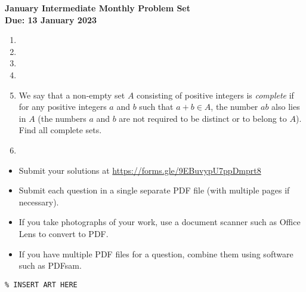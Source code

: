 \documentclass{article}
\begin{document}
\thispagestyle{empty}

\begin{center}
  \textbf{\Large January Intermediate Monthly Problem Set}
  \\ \vspace{1em}
  \textbf{\large Due: 13 January 2023}
\end{center}

\bigskip \bigskip

\begin{enumerate}[itemsep=\fill]

\item %

 
\item %


\item %


\item %


\item %
We say that a non-empty set $A$ consisting of positive integers is \textit{complete} if for any positive integers $a$ and $b$ such that $a+b\in A$, the number $ab$ also lies in $A$ (the numbers $a$ and $b$ are not required to be distinct or to belong to $A$). Find all complete sets.

\item %

\end{enumerate}


\vfill
\small
\begin{itemize}
	\item Submit your solutions at \href{https://forms.gle/9EBuvypU7ppDmprt8}{https://forms.gle/9EBuvypU7ppDmprt8}
	\item Submit each question in a single separate PDF file (with multiple pages if necessary).
	\item If you take photographs of your work, use a document scanner such as Office Lens to convert to PDF.
	\item If you have multiple PDF files for a question, combine them using software such as PDFsam.
\end{itemize}

\vfill
\centering
\small
\begin{BVerbatim}
\end{BVerbatim}
\end{document}
